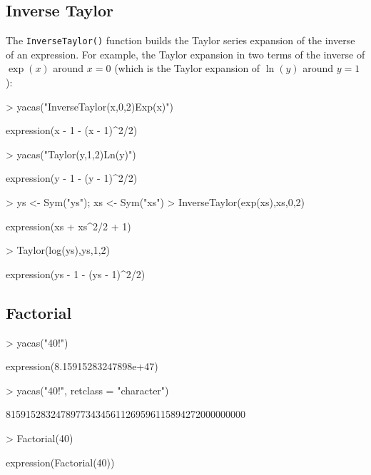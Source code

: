 \documentclass[10pt]{article}
\newcommand{\code}[1]{{\tt #1}}
\begin{document}
\subsection{Inverse Taylor}
\label{sec:inverse-taylor}


The \code{InverseTaylor()} function builds the Taylor series expansion
of the inverse of an expression. For example, the Taylor expansion in
two terms of the inverse of $\exp(x)$ around $x=0$ (which is the
Taylor expansion of $\ln(y)$ around $y=1$):
\begin{Schunk}
\begin{Sinput}
> yacas("InverseTaylor(x,0,2)Exp(x)")
\end{Sinput}
\begin{Soutput}
expression(x - 1 - (x - 1)^2/2)
\end{Soutput}
\begin{Sinput}
> yacas("Taylor(y,1,2)Ln(y)")
\end{Sinput}
\begin{Soutput}
expression(y - 1 - (y - 1)^2/2)
\end{Soutput}
\end{Schunk}

\begin{Schunk}
\begin{Sinput}
> ys <- Sym("ys"); xs <- Sym("xs")
> InverseTaylor(exp(xs),xs,0,2)
\end{Sinput}
\begin{Soutput}
expression(xs + xs^2/2 + 1)
\end{Soutput}
\begin{Sinput}
> Taylor(log(ys),ys,1,2)
\end{Sinput}
\begin{Soutput}
expression(ys - 1 - (ys - 1)^2/2)
\end{Soutput}
\end{Schunk}


\subsection{Factorial}

\begin{Schunk}
\begin{Sinput}
> yacas("40!")
\end{Sinput}
\begin{Soutput}
expression(8.15915283247898e+47)
\end{Soutput}
\begin{Sinput}
> yacas("40!", retclass = "character")
\end{Sinput}
\begin{Soutput}
815915283247897734345611269596115894272000000000 
\end{Soutput}
\begin{Sinput}
> Factorial(40)
\end{Sinput}
\begin{Soutput}
expression(Factorial(40))
\end{Soutput}
\end{Schunk}
\end{document}
